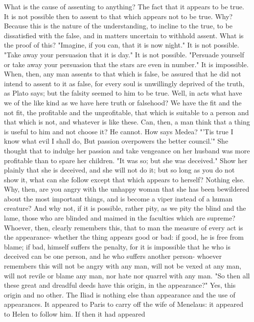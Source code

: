 \documentclass[a4paper]{article}
\begin{document}
    What is the cause of assenting to anything? The fact that it appears to be
true. It is not possible then to assent to that which appears not to be true.
Why? Because this is the nature of the understanding, to incline to the true,
to be dissatisfied with the false, and in matters uncertain to withhold assent.
What is the proof of this? "Imagine, if you can, that it is now night." It is
not possible. "Take away your persuasion that it is day." It is not possible.
"Persuade yourself or take away your persuasion that the stars are even in
number." It is impossible. When, then, any man assents to that which is false,
be assured that he did not intend to assent to it as false, for every soul is
unwillingly deprived of the truth, as Plato says; but the falsity seemed to him
to be true. Well, in acts what have we of the like kind as we have here truth
or falsehood? We have the fit and the not fit, the profitable and the
unprofitable, that which is suitable to a person and that which is not, and
whatever is like these. Can, then, a man think that a thing is useful to him
and not choose it? He cannot. How says Medea?
       "'Tis true I know what evil I shall do,
       But passion overpowers the better council.'"
She thought that to indulge her passion and take vengeance on her husband was
more profitable than to spare her children. "It was so; but she was deceived."
Show her plainly that she is deceived, and she will not do it; but so long as
you do not show it, what can she follow except that which appears to herself?
Nothing else. Why, then, are you angry with the unhappy woman that she has been
bewildered about the most important things, and is become a viper instead of a
human creature? And why not, if it is possible, rather pity, as we pity the
blind and the lame, those who are blinded and maimed in the faculties which are
supreme?
    Whoever, then, clearly remembers this, that to man the measure of every act
is the appearance- whether the thing appears good or bad: if good, he is free
from blame; if bad, himself suffers the penalty, for it is impossible that he
who is deceived can be one person, and he who suffers another person- whoever
remembers this will not be angry with any man, will not be vexed at any man,
will not revile or blame any man, nor hate nor quarrel with any man.
    "So then all these great and dreadful deeds have this origin, in the
appearance?" Yes, this origin and no other. The Iliad is nothing else than
appearance and the use of appearances. It appeared to Paris to carry off the
wife of Menelaus: it appeared to Helen to follow him. If then it had appeared
\end{document}
